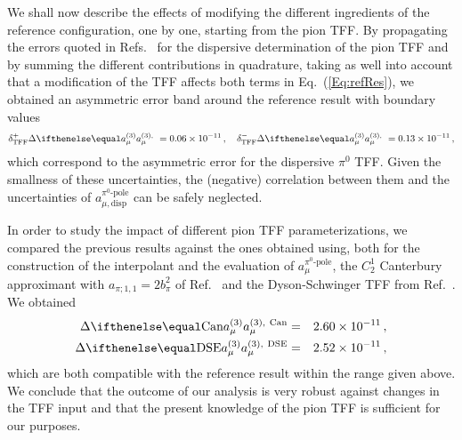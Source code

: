 We shall now describe the effects of modifying the different ingredients of the reference configuration, one by one, starting from the pion TFF.
By propagating the errors quoted in Refs.~\cite{PionTFFshort,PionTFF} for the dispersive determination of the pion TFF and by summing the different contributions in quadrature, taking as well into account that a modification of the TFF affects both terms in Eq.~(\ref{Eq:refRes}), we obtained an asymmetric error band around the reference result with boundary values
\begin{equation}
\delta^+_\text{TFF} \Delta \aPion = \num{0.06e-11}\,, \quad \delta^-_\text{TFF} \Delta \aPion = \num{0.13e-11}\,,
\end{equation}
which correspond to the asymmetric error for the dispersive $\pi^0$ TFF. Given the smallness of these uncertainties, the (negative) correlation between them and the uncertainties of $a_{\mu,\text{disp}}^{\pi^0\text{-pole}}$ can be safely neglected.

In order to study the impact of different pion TFF parameterizations, we compared the previous results against the ones obtained using, both for the construction of the interpolant and the evaluation of $a_{\mu}^{\pi^0\text{-pole}}$, the $C^1_2$ Canterbury approximant with $a_{\pi; 1,1} = 2 b_\pi^2$ of Ref.~\cite{Canterbury}  and the Dyson-Schwinger TFF from Ref.~\cite{DSE}. We obtained
\begin{eqnarray}
\Delta \aPion[\text{Can}] &=& \num{2.60e-11}\,, \nonumber\\ \Delta \aPion[\text{DSE}] &=& \num{2.52e-11}\,, 
\end{eqnarray}
which are both compatible with the reference result within the range given above. We conclude that the outcome of our analysis is very robust against changes in the TFF input and that the present knowledge of the pion TFF is sufficient for our purposes.

